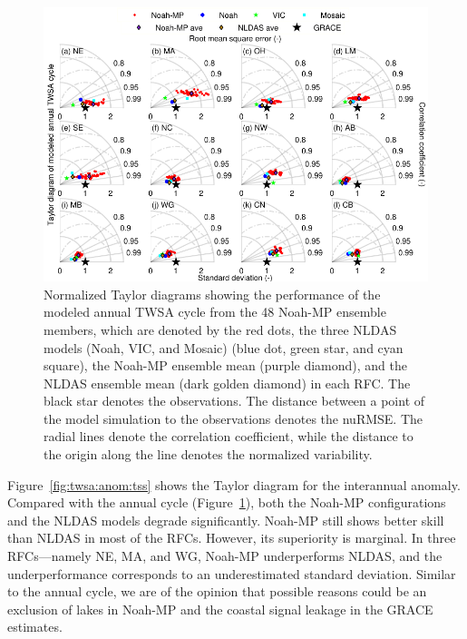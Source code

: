 \documentclass[essd, manuscript]{copernicus}
\begin{document}
\begin{figure}[t]
  \includegraphics[width=12cm]{fig/fig02.pdf}
  \caption{Normalized Taylor diagrams showing the performance of the modeled annual TWSA cycle from the 48 Noah-MP ensemble members, which are denoted by the red dots, the three NLDAS models (Noah, VIC, and Mosaic) (blue dot, green star, and cyan square), the Noah-MP ensemble mean (purple diamond), and the NLDAS ensemble mean (dark golden diamond) in each RFC. The black star denotes the observations. The distance between a point of the model simulation to the observations denotes the nuRMSE. The radial lines denote the correlation coefficient, while the distance to the origin along the line denotes the normalized variability.}
  \label{fig:twsa:ancy:tss}
\end{figure}

Figure~\ref{fig:twsa:anom:tss} shows the Taylor diagram for the interannual anomaly. Compared with the annual cycle (Figure~\ref{fig:twsa:ancy:tss}), both the Noah-MP configurations and the NLDAS models degrade significantly. Noah-MP still shows better skill than NLDAS in most of the RFCs. However, its superiority is marginal. In three RFCs---namely NE, MA, and WG, Noah-MP underperforms NLDAS, and the underperformance corresponds to an underestimated standard deviation. Similar to the annual cycle, we are of the opinion that possible reasons could be an exclusion of lakes in Noah-MP and the coastal signal leakage in the GRACE estimates.
\end{document}

